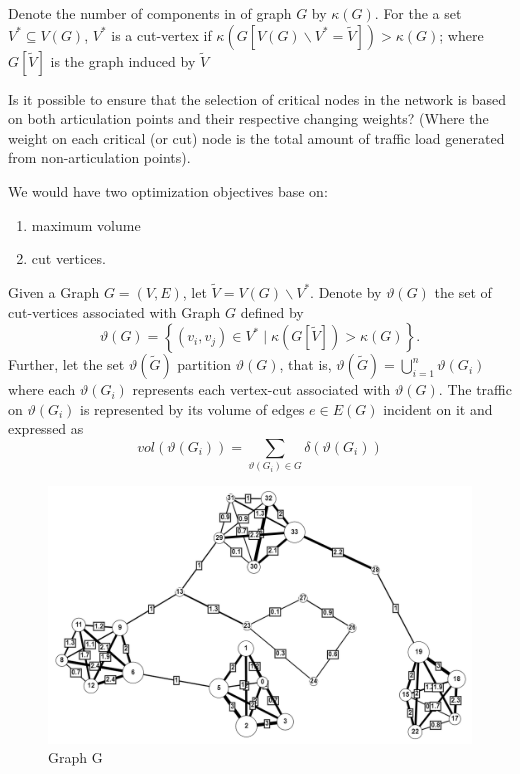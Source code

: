 Denote the number of components in of graph $G$ by $\kappa(G)$. For the a set $V^* \subseteq V(G)$, $V^*$ is a cut-vertex
if $\kappa(G[V(G)\backslash V^* = \tilde{V} ]) > \kappa(G)$; where  $G[\tilde{V}]$ is the graph induced by $\tilde{V}$

\begin{question}
  \label{pythagorean}
  Is it possible to ensure that the selection of critical nodes in the network is based on both articulation points and their respective changing weights?
  (Where the weight on each critical (or cut) node is the total amount of traffic load generated from non-articulation points).
\end{question}

\begin{approach}
  We would have two optimization objectives base on:
  \begin{enumerate}
    \item maximum volume
    \item cut vertices.
  \end{enumerate}
\end{approach}


\begin{problem}
Given a Graph $G = (V, E)$, let $ \tilde{V} = V(G)\backslash V^*$. Denote by $\vartheta (G)$ the set of cut-vertices associated with Graph $G$ defined by
\begin{equation}
  \vartheta (G) =\left\{(v_i, v_j)\in V^* \; \vert \; \kappa(G[\tilde{V} ]) > \kappa(G)\right\}.
\end{equation}
Further, let the set $\vartheta (\tilde{G} )$ partition  $\vartheta (G)$, that is,
$\vartheta (\tilde{G}) = \bigcup_{i=1}^n \vartheta (G_i)$ where each  $\vartheta (G_i)$ represents each
vertex-cut associated with $\vartheta (G)$. The traffic on $\vartheta (G_i)$ is represented by its volume
of edges $e \in E(G)$
incident on it and expressed as
\begin{equation}
  vol(\vartheta (G_i)) = \sum_{\vartheta (G_i)\in G} \delta(\vartheta (G_i))
\end{equation}
\end{problem}


\begin{figure}[htb!]
  \centering
  \includegraphics[width=\textwidth]{figures/full_graph.png}
  \caption{Graph G}
  \label{fig:full_graph}
\end{figure}


